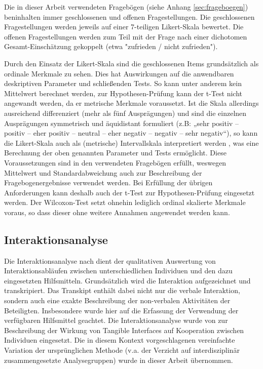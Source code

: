 Die in dieser Arbeit verwendeten Fragebögen (siehe Anhang \ref{sec:frageboegen}) beninhalten immer geschlossenen und offenen Fragestellungen. Die geschlossenen Fragestellungen werden jeweils auf einer 7-teiligen Likert-Skala bewertet. Die offenen Fragestellungen werden zum Teil mit der Frage nach einer dichotomen Gesamt-Einschätzung gekoppelt (etwa "zufrieden / nicht zufrieden").

Durch den Einsatz der Likert-Skala sind die geschlossenen Items grundsätzlich als ordinale Merkmale zu sehen. Dies hat Auswirkungen auf die anwendbaren deskriptiven Parameter und schließenden Tests. So kann unter anderem kein Mittelwert berechnet werden, zur Hypothesen-Prüfung kann der t-Test nicht angewandt werden, da er metrische Merkmale voraussetzt. Ist die Skala allerdings ausreichend differenziert (mehr als fünf Ausprägungen) und sind die einzelnen Ausprägungen symmetrisch und äquidistant formuliert (z.B: „sehr positiv -- positiv -- eher positiv -- neutral -- eher negativ -- negativ -- sehr negativ“), so kann die Likert-Skala auch als (metrische) Intervallskala interpretiert werden \citep[][S. 222f]{Bortz03}, was eine Berechnung der oben genannten Parameter und Tests ermöglicht. Diese Voraussetzungen sind in den verwendeten Fragebögen erfüllt, weswegen Mittelwert und Standardabweichung auch zur Beschreibung der Fragebogenergebnisse verwendet werden. Bei Erfüllung der übrigen Anforderungen kann deshalb auch der t-Test zur Hypothesen-Prüfung eingesetzt werden. Der Wilcoxon-Test setzt ohnehin lediglich ordinal skalierte Merkmale voraus, so dass dieser ohne weitere Annahmen angewendet werden kann.


\subsection{Interaktionsanalyse} %
\label{sub:interaktionsanalyse}

Die Interaktionsanalyse nach \citet{Jordan95} dient der qualitativen Auswertung von Interaktionsabläufen zwischen unterschiedlichen Individuen und den dazu eingesetzten Hilfsmitteln. Grundsätzlich wird die Interaktion aufgezeichnet und transkripiert. Das Transkipt enthält dabei nicht nur die verbale Interaktion, sondern auch eine exakte Beschreibung der non-verbalen Aktivitäten der Beteiligten. Insbesondere wurde hier auf die Erfassung der Verwendung der verfügbaren Hilfsmittel geachtet. Die Interaktionsanalyse wurde von \citet{Hornecker04} zur Beschreibung der Wirkung von Tangible Interfaces auf Kooperation zwischen Individuen eingesetzt. Die in diesem Kontext vorgeschlagenen vereinfachte Variation der ursprünglichen Methode (v.a. der Verzicht auf interdisziplinär zusammengesetzte Analysegruppen) wurde in dieser Arbeit übernommen. 

